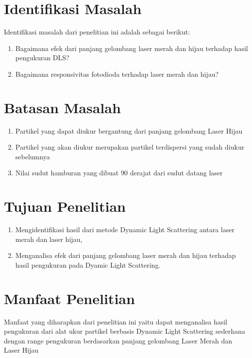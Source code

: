 \section{Identifikasi Masalah}
Identifikasi masalah dari penelitian ini adalah sebagai berikut:
\begin{enumerate}
  \item Bagaimana efek dari panjang gelombang laser merah dan hijau terhadap hasil pengukuran DLS?
  \item Bagaimana responsivitas fotodioda terhadap laser merah dan hijau?
\end{enumerate}

\section{Batasan Masalah}
\begin{enumerate}
    \item Partikel yang dapat diukur bergantung dari panjang gelombang Laser Hijau
    \item Partikel yang akan diukur merupakan partikel terdispersi yang sudah diukur sebelumnya
    \item Nilai sudut hamburan yang dibuat 90 derajat dari sudut datang laser
\end{enumerate}

\section{Tujuan Penelitian}
\begin{enumerate}
  \item Mengidentifikasi hasil dari metode Dynamic Light Scattering antara laser merah dan laser hijau,
  \item Menganalisa efek dari panjang gelombang laser merah dan hijau terhadap hasil pengukuran pada Dyamic Light Scattering.
\end{enumerate}

\section{Manfaat Penelitian}
Manfaat yang diharapkan dari penelitian ini yaitu dapat menganalisa hasil pengukuran dari alat ukur
partikel berbasis Dynamic Light Scattering sederhana dengan range pengukuran berdasarkan panjang
gelombang Laser Merah dan Laser Hijau

